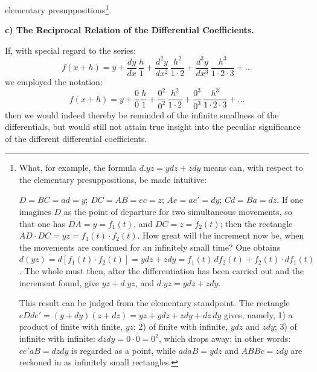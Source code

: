 \documentclass[12pt]{book}
\begin{document}
elementary presuppositions\footnote{What, for example, the formula $d.yz = ydz + zdy$
means can, with respect to the elementary presuppositions, be made intuitive:
\begin{center}
\end{center}
$D = BC = ad = y$; $DC = AB = ec = z$; $Ae = ae' = dy$; $Cd = Ba = dz$. If one imagines
$D$ as the point of departure for two simultaneous movements, so that one has
$DA = y = f_{1}(t)$, and $DC = z = f_{2}(t)$; then the rectangle
$AD\cdot DC = yz = f_{1}(t)\cdot f_{2}(t)$. How great will the increment now be, when
the movements are continued for an infinitely small time? One obtains
$d(yz) = d[f_{1}(t)\cdot f_{2}(t)] = ydz + zdy = f_{1}(t)\, d f_{2}(t)
+ f_{2}(t)\cdot d f_{1}(t)$. The whole must then, after the differentiation has been
carried out and the increment found, give $yz + d.yz$, and $d.yz = ydz + zdy$.

This result can be judged from the elementary standpoint. The rectangle
$eDde' = (y + dy)(z + dz) = yz + ydz + zdy + dz\,dy$ gives, namely, 1) a product of
finite with finite, $yz$; 2) of finite with infinite, $ydz$ and $zdy$; 3) of infinite
with infinite: $dzdy = 0\cdot0 = 0^{2}$, which drops away; in other words:
$ce'aB = dzdy$ is regarded as a point, while $adaB = ydz$ and $ABBc = zdy$ are
reckoned in as infinitely small rectangles.}.

\begin{center}
\textbf{c) The Reciprocal Relation of the Differential Coefficients.}
\end{center}
{}

If, with special regard to the series:
\[
f(x + h) = y + \frac{dy}{dx}\,\frac{h}{1} + \frac{d^{2}y}{dx^{2}}\,
\frac{h^{2}}{1\cdot2} + \frac{d^{3}y}{dx^{3}}\,\frac{h^{3}}{1\cdot2\cdot3} + \dots
\]
we employed the notation:
\[
f(x + h) = y + \frac{0}{0}\,\frac{h}{1} + \frac{0^{2}}{0^{2}}\,\frac{h^{2}}{1\cdot2}
+ \frac{0^{3}}{0^{3}}\,\frac{h^{3}}{1\cdot2\cdot3} + \dots
\]
then we would indeed thereby be reminded of the infinite smallness of the
differentials, but would still not attain true insight into the peculiar significance
of the different differential coefficients.
\end{document}
